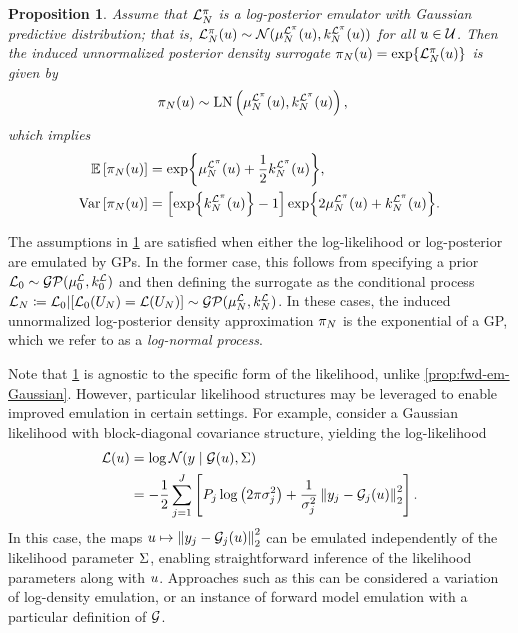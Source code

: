\documentclass[12pt]{article}
\newtheorem{prop}{Proposition}
\begin{document}
\begin{prop} \label{prop:llik-em-Gaussian}
Assume that $\lpostEm[\Ndesign]$ is a log-posterior emulator with Gaussian predictive distribution; 
that is, $\lpostEm[\Ndesign](\Par) \sim \Gaussian(\emMean[\Ndesign]{\lpost}(\Par), \emKer[\Ndesign]{\lpost}(\Par))$
for all $\Par \in \parSpace$. Then the induced unnormalized posterior density surrogate 
$\postEm[\Ndesign](\Par) = \Exp{\lpostEm[\Ndesign](\Par)}$ is given by
\begin{align}
\postEm[\Ndesign](\Par) &\sim \text{LN}\left(\emMean[\Ndesign]{\lpost}(\Par), \emKer[\Ndesign]{\lpost}(\Par)\right),
\end{align}
which implies 
\begin{align}
\E\left[\postEm[\Ndesign](\Par)\right] &= \Exp{\emMean[\Ndesign]{\lpost}(\Par) + \frac{1}{2}\emKer[\Ndesign]{\lpost}(\Par)}, \\
\Var\left[\postEm[\Ndesign](\Par)\right] &= \left[\Exp{\emKer[\Ndesign]{\lpost}(\Par)} - 1\right] \Exp{2\emMean[\Ndesign]{\lpost}(\Par) + \emKer[\Ndesign]{\lpost}(\Par)}.
\end{align}
\end{prop}

The assumptions in \cref{prop:llik-em-Gaussian} are satisfied when either the 
log-likelihood or log-posterior are emulated by GPs. In the former case,
this follows from specifying a prior 
$\llikEm[0] \sim \GP(\emMean[0]{\llik}, \emKer[0]{\llik})$ and then defining 
the surrogate as the conditional process
$\llikEm[\Ndesign] \Def \llikPrior | [\llikPrior(\designIn) = \llik(\designIn)] \sim \GP(\emMean[\Ndesign]{\llik}, \emKer[\Ndesign]{\llik})$.
In these cases, the induced unnormalized log-posterior density approximation 
$\postEm[\Ndesign]$ is the exponential of a GP, which we refer to as a 
\textit{log-normal process}.

Note that \cref{prop:llik-em-Gaussian} is agnostic to the specific form of the 
likelihood, unlike \cref{prop:fwd-em-Gaussian}. However, particular likelihood
structures may be leveraged to enable improved emulation in certain settings. For example, 
\citet{FerEmulation} consider a Gaussian likelihood with block-diagonal covariance structure, yielding
the log-likelihood
\begin{align}
\llik(\Par) 
&= \log \Gaussian(\obs \given \fwd(\Par), \likPar) \nonumber \\
&= - \frac{1}{2} \sum_{j=1}^{J} \left[\dimObs_j \log\left(2\pi\sigma_j^2\right) +
 \frac{1}{\sigma_j^2} \norm{\obs_j - \fwd_j(\Par)}_2^2 \right].
\end{align}
In this case, the maps $\Par \mapsto \norm{\obs_j - \fwd_j(\Par)}_2^2$ can be emulated 
independently of the likelihood parameter $\likPar$, enabling straightforward inference of the 
likelihood parameters along with $\Par$.
Approaches such as this can be considered a variation of log-density emulation, or an instance of 
forward model emulation with a particular definition of $\fwd$.
 
\end{document}
